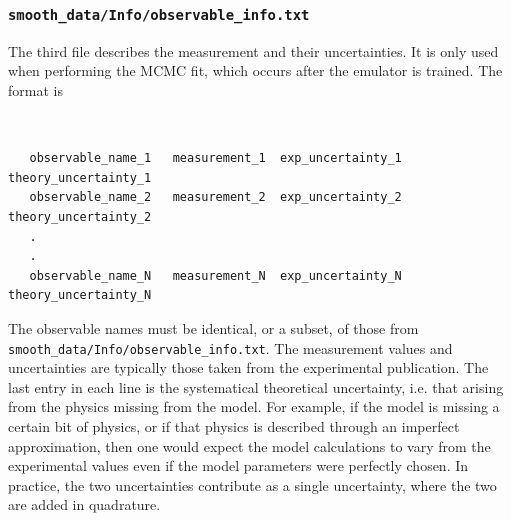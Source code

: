 \documentclass[UserManual.tex]{subfiles}
\begin{document}
\subsubsection{{\tt smooth\_data/Info/observable\_info.txt}}
The third file describes the measurement and their uncertainties. It is only used when performing the MCMC fit, which occurs after the emulator is trained. The format is
{\tt
\begin{verbatim}
   observable_name_1   measurement_1  exp_uncertainty_1   theory_uncertainty_1
   observable_name_2   measurement_2  exp_uncertainty_2   theory_uncertainty_2
   .
   .
   observable_name_N   measurement_N  exp_uncertainty_N   theory_uncertainty_N\end{verbatim}
}
The observable names must be identical, or a subset, of those from {\tt smooth\_data/Info/observable\_info.txt}. The measurement values and uncertainties are typically those taken from the experimental publication. The last entry in each line is the systematical theoretical uncertainty, i.e. that arising from the physics missing from the model. For example, if the model is missing a certain bit of physics, or if that physics is described through an imperfect approximation, then one would expect the model calculations to vary from the experimental values even if the model parameters were perfectly chosen. In practice, the two uncertainties contribute as a single uncertainty, where the two are added in quadrature. 
\end{document}
